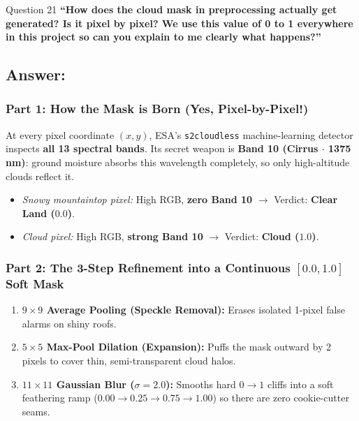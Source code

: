 \documentclass[11pt,a4paper]{article}
\begin{document}
\begin{questionbox}{Question 21}
\textbf{``How does the cloud mask in preprocessing actually get generated? Is it pixel by pixel? We use this value of 0 to 1 everywhere in this project so can you explain to me clearly what happens?''}
\end{questionbox}

\subsection*{Answer:}
\subsubsection*{Part 1: How the Mask is Born (Yes, Pixel-by-Pixel!)}
At every pixel coordinate $(x, y)$, ESA's \texttt{s2cloudless} machine-learning detector inspects \textbf{all 13 spectral bands}. Its secret weapon is \textbf{Band 10 (Cirrus $\cdot$ 1375 nm)}: ground moisture absorbs this wavelength completely, so only high-altitude clouds reflect it.
\begin{itemize}[leftmargin=1.5em]
    \item \textit{Snowy mountaintop pixel:} High RGB, \textbf{zero Band 10} $\to$ Verdict: \textbf{Clear Land ($0.0$)}.
    \item \textit{Cloud pixel:} High RGB, \textbf{strong Band 10} $\to$ Verdict: \textbf{Cloud ($1.0$)}.
\end{itemize}

\subsubsection*{Part 2: The 3-Step Refinement into a Continuous $[0.0, 1.0]$ Soft Mask}
\begin{enumerate}[leftmargin=1.5em]
    \item \textbf{$9\times 9$ Average Pooling (Speckle Removal):} Erases isolated 1-pixel false alarms on shiny roofs.
    \item \textbf{$5\times 5$ Max-Pool Dilation (Expansion):} Puffs the mask outward by 2 pixels to cover thin, semi-transparent cloud halos.
    \item \textbf{$11\times 11$ Gaussian Blur ($\sigma = 2.0$):} Smooths hard $0 \to 1$ cliffs into a soft feathering ramp ($0.00 \to 0.25 \to 0.75 \to 1.00$) so there are zero cookie-cutter seams.
\end{enumerate}
\end{document}

